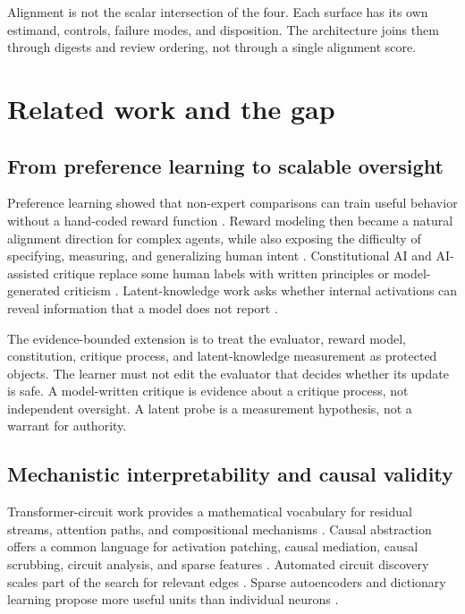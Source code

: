 \documentclass[11pt,twoside]{article}
\newcommand{\sourcecite}[1]{\parencite{#1}}
\begin{document}
  Alignment is not the scalar intersection of the four. Each surface has its own estimand, controls, failure modes, and disposition. The architecture joins them through digests and review ordering, not through a single alignment score.

\section{Related work and the gap}

\subsection{From preference learning to scalable oversight}

  Preference learning showed that non-expert comparisons can train useful behavior without a hand-coded reward function \sourcecite{christiano2017human}. Reward modeling then became a natural alignment direction for complex agents, while also exposing the difficulty of specifying, measuring, and generalizing human intent \sourcecite{leike2018scalable}. Constitutional AI and AI-assisted critique replace some human labels with written principles or model-generated criticism \sourcecite{bai2022constitutional,saunders2022self}. Latent-knowledge work asks whether internal activations can reveal information that a model does not report \sourcecite{burns2022latent}.

  The evidence-bounded extension is to treat the evaluator, reward model, constitution, critique process, and latent-knowledge measurement as protected objects. The learner must not edit the evaluator that decides whether its update is safe. A model-written critique is evidence about a critique process, not independent oversight. A latent probe is a measurement hypothesis, not a warrant for authority.

\subsection{Mechanistic interpretability and causal validity}

  Transformer-circuit work provides a mathematical vocabulary for residual streams, attention paths, and compositional mechanisms \sourcecite{elhage2021framework}. Causal abstraction offers a common language for activation patching, causal mediation, causal scrubbing, circuit analysis, and sparse features \sourcecite{geiger2023causal}. Automated circuit discovery scales part of the search for relevant edges \sourcecite{conmy2023acdc}. Sparse autoencoders and dictionary learning propose more useful units than individual neurons \sourcecite{bricken2023monosemanticity,cunningham2023sparse}.
\end{document}
